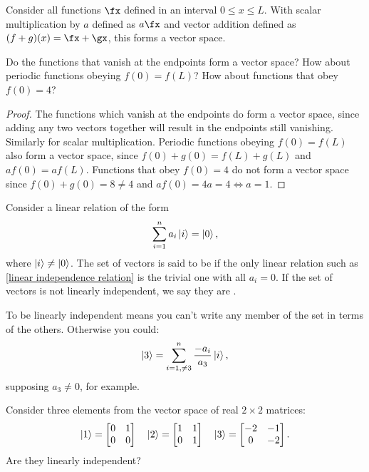 \begin{example}
Consider all functions $\fx$ defined in an interval $0 \leq x \leq L$. With scalar multiplication by $a$ defined as $a\fx$ and vector addition defined as $(f + g)(x) = \fx + \gx$, this forms a vector space.
\end{example}

\begin{exercise}
Do the functions that vanish at the endpoints form a vector space? How about periodic functions obeying $f(0) = f(L)$? How about functions that obey $f(0) = 4$?
\end{exercise}

\begin{proof}
The functions which vanish at the endpoints do form a vector space, since adding any two vectors together will result in the endpoints still vanishing. Similarly for scalar multiplication. Periodic functions obeying $f(0) = f(L)$ also form a vector space, since $f(0) + g(0) = f(L) + g(L)$ and $af(0) = af(L)$. Functions that obey $f(0) = 4$ do not form a vector space since $f(0) + g(0) = 8 \neq 4$ and $af(0) = 4a = 4 \iff a = 1$.
\end{proof}

\begin{shaded*}
Consider a linear relation of the form
\begin{equation}\label{linear independence relation}
    \sum_{i = 1}^n a_i \ket{i} = \ket{0},
\end{equation}
where $\ket{i} \neq \ket{0}$. The set of vectors is said to be  if the only linear relation such as \eqref{linear independence relation} is the trivial one with all $a_i = 0$. If the set of vectors is not linearly independent, we say they are .
\end{shaded*}

To be linearly independent means you can't write any member of the set in terms of the others. Otherwise you could:
\begin{equation*}
    \ket{3} = \sum_{i = 1, \neq 3}^n \frac{-a_i}{a_3}\ket{i},
\end{equation*}
supposing $a_3 \neq 0$, for example.

\begin{exercise}
Consider three elements from the vector space of real $2 \times 2$ matrices:
$$
\ket{1} = 
\begin{bmatrix}
0 & 1 \\
0 & 0
\end{bmatrix}
\quad
\ket{2} = 
\begin{bmatrix}
1 & 1 \\
0 & 1
\end{bmatrix}
\quad
\ket{3} = 
\begin{bmatrix}
-2 & -1 \\
0  & -2
\end{bmatrix}.
$$
Are they linearly independent?
\end{exercise}

